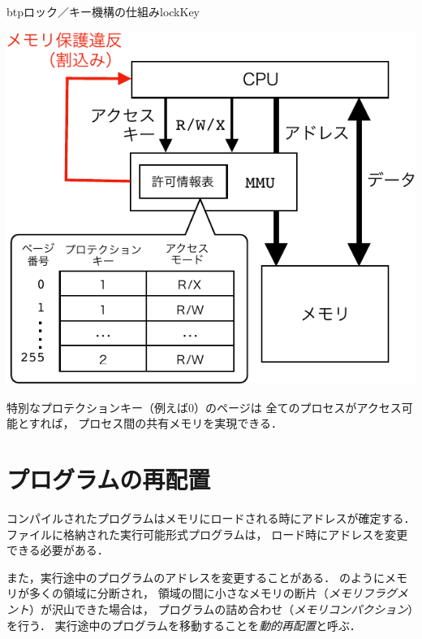 \begin{myfig}{btp}{ロック／キー機構の仕組み}{lockKey}
\begin{minipage}{0.49\columnwidth}
\begin{center}
      \includegraphics[scale=0.66]{Fig/lockKeyHardware-crop.pdf}
      \label{fig:lockKeyHardware}
    \end{center}
  \end{minipage}
\end{myfig}

特別なプロテクションキー（例えば0）のページは
全てのプロセスがアクセス可能とすれば，
プロセス間の共有メモリを実現できる．

\section{プログラムの再配置}
コンパイルされたプログラムはメモリにロードされる時にアドレスが確定する．
ファイルに格納された実行可能形式プログラムは，
ロード時にアドレスを変更できる必要がある．

また，実行途中のプログラムのアドレスを変更することがある．
のようにメモリが多くの領域に分断され，
領域の間に小さなメモリの断片（\emph{メモリフラグメント}）が沢山できた場合は，
プログラムの詰め合わせ（\emph{メモリコンパクション}）を行う．
実行途中のプログラムを移動することを\emph{動的再配置}と呼ぶ．

